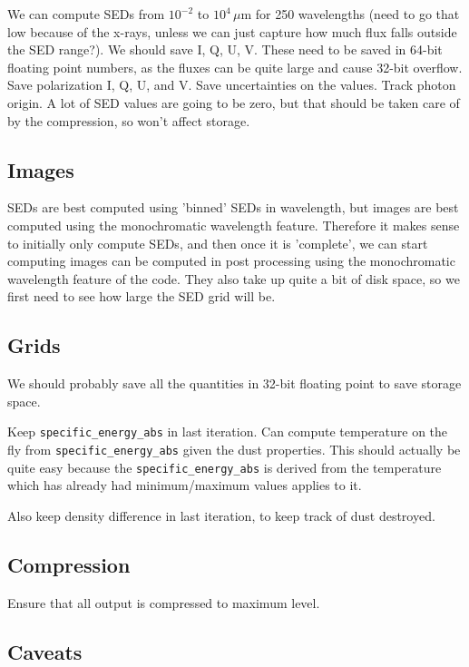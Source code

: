 \documentclass[10pt]{article}
\begin{document}
We can compute SEDs from $10^{-2}$ to $10^4$\,$\mu$m for 250 wavelengths (need to go that low because of the x-rays, unless we can just capture how much flux falls outside the SED range?). We should save I, Q, U, V. These need to be saved in 64-bit floating point numbers, as the fluxes can be quite large and cause 32-bit overflow. Save polarization I, Q, U, and V. Save uncertainties on the values. Track photon origin. A lot of SED values are going to be zero, but that should be taken care of by the compression, so won't affect storage.

\subsection{Images}

SEDs are best computed using 'binned' SEDs in wavelength, but images are best computed using the monochromatic wavelength feature. Therefore it makes sense to initially only compute SEDs, and then once it is 'complete', we can start computing images can be computed in post processing using the monochromatic wavelength feature of the code. They also take up quite a bit of disk space, so we first need to see how large the SED grid will be.

\subsection{Grids}

We should probably save all the quantities in 32-bit floating point to save storage space.

Keep \texttt{specific\_energy\_abs} in last iteration. Can compute temperature on the fly from \texttt{\texttt{specific\_energy\_abs}} given the dust properties. This should actually be quite easy because the \texttt{specific\_energy\_abs} is derived from the temperature which has already had minimum/maximum values applies to it.

Also keep density difference in last iteration, to keep track of dust destroyed.

\subsection{Compression}

Ensure that all output is compressed to maximum level.

\subsection{Caveats}
\end{document}
